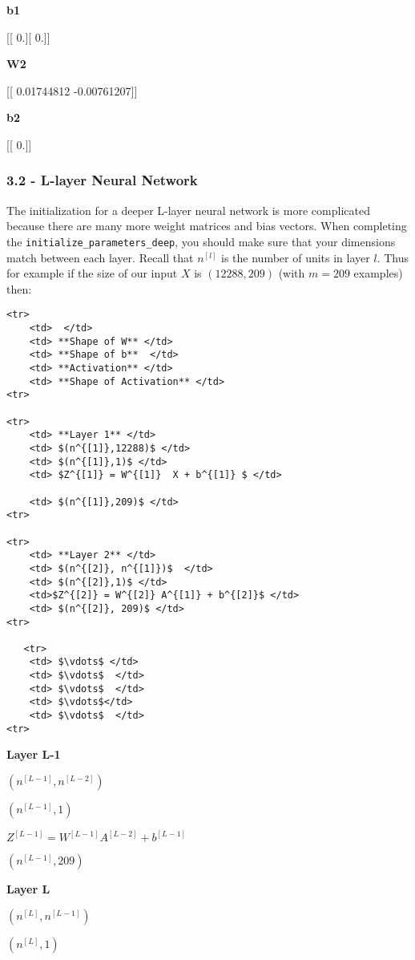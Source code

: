 \documentclass[11pt]{article}
\begin{document}
\textbf{b1}

{[}{[} 0.{]}{[} 0.{]}{]}

\textbf{W2}

{[}{[} 0.01744812 -0.00761207{]}{]}

\textbf{b2}

{[}{[} 0.{]}{]}

    \subsubsection{3.2 - L-layer Neural
Network}\label{l-layer-neural-network}

The initialization for a deeper L-layer neural network is more
complicated because there are many more weight matrices and bias
vectors. When completing the \texttt{initialize\_parameters\_deep}, you
should make sure that your dimensions match between each layer. Recall
that $n^{[l]}$ is the number of units in layer $l$. Thus for example if
the size of our input $X$ is $(12288, 209)$ (with $m=209$ examples)
then:

\begin{verbatim}
<tr>
    <td>  </td> 
    <td> **Shape of W** </td> 
    <td> **Shape of b**  </td> 
    <td> **Activation** </td>
    <td> **Shape of Activation** </td> 
<tr>

<tr>
    <td> **Layer 1** </td> 
    <td> $(n^{[1]},12288)$ </td> 
    <td> $(n^{[1]},1)$ </td> 
    <td> $Z^{[1]} = W^{[1]}  X + b^{[1]} $ </td> 
    
    <td> $(n^{[1]},209)$ </td> 
<tr>

<tr>
    <td> **Layer 2** </td> 
    <td> $(n^{[2]}, n^{[1]})$  </td> 
    <td> $(n^{[2]},1)$ </td> 
    <td>$Z^{[2]} = W^{[2]} A^{[1]} + b^{[2]}$ </td> 
    <td> $(n^{[2]}, 209)$ </td> 
<tr>

   <tr>
    <td> $\vdots$ </td> 
    <td> $\vdots$  </td> 
    <td> $\vdots$  </td> 
    <td> $\vdots$</td> 
    <td> $\vdots$  </td> 
<tr>
\end{verbatim}

\textbf{Layer L-1}

$(n^{[L-1]}, n^{[L-2]})$

$(n^{[L-1]}, 1)$

$Z^{[L-1]} =  W^{[L-1]} A^{[L-2]} + b^{[L-1]}$

$(n^{[L-1]}, 209)$

\textbf{Layer L}

$(n^{[L]}, n^{[L-1]})$

$(n^{[L]}, 1)$
\end{document}
